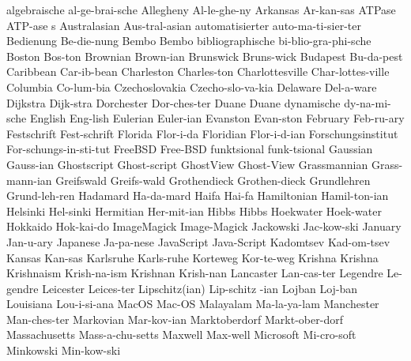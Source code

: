 \begingroup
\eightpoint
\1 algebraische 	al-ge-brai-sche
\1 Allegheny		Al-le-ghe-ny
\1 Arkansas		Ar-kan-sas
\5 ATPase		ATP-ase s		%
\1 Australasian 	Aus-tral-asian
\1 automatisierter	auto-ma-ti-sier-ter
\1 Bedienung		Be-die-nung
\1 Bembo                Bembo			%
\1 bibliographische	bi-blio-gra-phi-sche
\1 Boston		Bos-ton
\1 Brownian		Brown-ian
\1 Brunswick		Bruns-wick
\1 Budapest		Bu-da-pest
\1 Caribbean		Car-ib-bean
\1 Charleston		Charles-ton
\1 Charlottesville	Char-lottes-ville
\1 Columbia		Co-lum-bia
\1 Czechoslovakia	Czecho-slo-va-kia
\1 Delaware		Del-a-ware		%
\1 Dijkstra		Dijk-stra
\NewWordtrue
\1 Dorchester		Dor-ches-ter		%
\1 Duane		Duane			%
\1 dynamische		dy-na-mi-sche
\1 English		Eng-lish
\1 Eulerian		Euler-ian
\1 Evanston		Evan-ston
\1 February		Feb-ru-ary
\1 Festschrift		Fest-schrift
\1 Florida		Flor-i-da
\1 Floridian		Flor-i-d-ian
\1 Forschungsinstitut	For-schungs-in-sti-tut
\1 FreeBSD		Free-BSD		%
\1 funktsional		funk-tsional
\1 Gaussian		Gauss-ian
\1 Ghostscript		Ghost-script		%
\1 GhostView		Ghost-View		%
\1 Grassmannian		Grass-mann-ian		%
\1 Greifswald		Greifs-wald
\1 Grothendieck		Grothen-dieck
\1 Grundlehren		Grund-leh-ren
\1 Hadamard		Ha-da-mard		%
\1 Haifa		Hai-fa
\1 Hamiltonian		Hamil-ton-ian
\1 Helsinki		Hel-sinki
\1 Hermitian		Her-mit-ian
\1 Hibbs		Hibbs
\NewWordtrue
\1 Hoekwater		Hoek-water		%
\1 Hokkaido		Hok-kai-do
\NewWordtrue
\1 ImageMagick		Image-Magick		%
\1 Jackowski		Jac-kow-ski		%
\1 January		Jan-u-ary
\1 Japanese		Ja-pa-nese
\NewWordtrue
\1 JavaScript		Java-Script		%
\1 Kadomtsev		Kad-om-tsev
\1 Kansas		Kan-sas
\1 Karlsruhe		Karls-ruhe
\1 Korteweg		Kor-te-weg
\1 Krishna		Krishna
\1 Krishnaism		Krish-na-ism
\1 Krishnan		Krish-nan	%
\1 Lancaster		Lan-cas-ter
\1 Legendre		Le-gendre
\1 Leicester		Leices-ter
\2 Lipschitz(ian)	Lip-schitz -ian
\1 Lojban		Loj-ban		%
\1 Louisiana		Lou-i-si-ana
\1 MacOS		Mac-OS			%
\1 Malayalam		Ma-la-ya-lam		%
\1 Manchester		Man-ches-ter
\1 Markovian		Mar-kov-ian
\1 Marktoberdorf	Markt-ober-dorf  %
\1 Massachusetts	Mass-a-chu-setts
\1 Maxwell		Max-well		%
\1 Microsoft		Mi-cro-soft		%
\NewWordtrue
\1 Minkowski		Min-kow-ski		%
